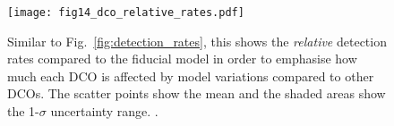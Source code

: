 \begin{figure}[hb]
    \centering
    \texttt{[image: fig14\_dco\_relative\_rates.pdf]}
    \caption{Similar to Fig.~\ref{fig:detection_rates}, this shows the \textit{relative} detection rates compared to the fiducial model in order to emphasise how much each DCO is affected by model variations compared to other DCOs. The scatter points show the mean and the shaded areas show the 1-$\sigma$ uncertainty range. \href{https://github.com/TomWagg/detecting-DCOs-in-LISA/blob/main/paper/figures/fig14_dco_relative_rates.pdf}{\faFileImage} \href{https://github.com/TomWagg/detecting-DCOs-in-LISA/blob/main/paper/figure_notebooks/detections.ipynb}{\faBook}.}
    \label{fig:dco_relative_rates}
\end{figure}


